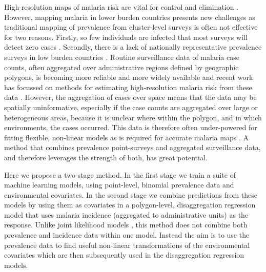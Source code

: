 \documentclass[review]{elsarticle}
\begin{document}


High-resolution maps of malaria risk are vital for control and elimination \citep{weiss2019mapping, battle2019mapping}.
However, mapping malaria in lower burden countries presents new challenges as traditional mapping of prevalence from cluster-level surveys \cite{weiss2019mapping,battle2019mapping, bhatt2017improved, bhatt2015effect} is often not effective for two reasons.
Firstly, so few individuals are infected that most surveys will detect zero cases \citep{sturrock2016mapping}.
Secondly, there is a lack of nationally representative prevalence surveys in low burden countries \citep{sturrock2016mapping, sturrock2014fine}. 
Routine surveillance data of malaria case counts, often aggregated over administrative regions defined by geographic polygons, is becoming more reliable and more widely available \citep{sturrock2016mapping} and recent work has focussed on methods for estimating high-resolution malaria risk from these data \citep{sturrock2014fine, wilson2017pointless, law2018variational, taylor2017continuous, li2012log, johnson2019spatially}. 
However, the aggregation of cases over space means that the data may be spatially uninformative, especially if the case counts are aggregated over large or heterogeneous areas, because it is unclear where within the polygon, and in which environments, the cases occurred. 
This data is therefore often under-powered for fitting flexible, non-linear models as is required for accurate malaria maps \citep{bhatt2017improved, bhatt2015effect}. 
A method that combines prevalence point-surveys and aggregated surveillance data, and therefore leverages the strength of both, has great potential.

Here we propose a two-stage method.
In the first stage we train a suite of machine learning models, using point-level, binomial prevalence data and environmental covariates.
In the second stage we combine predictions from these models by using them as covariates in a polygon-level, disaggregation regression model that uses  malaria incidence (aggregated to administrative units) as the response.
Unlike joint likelihood models \citep{wang2018generalized}, this method does not combine both prevalence and incidence data within one model.
Instead the aim is to use the prevalence data to find useful non-linear transformations of the environmental covariates which are then subsequently used in the disaggregation regression models.
\end{document}
